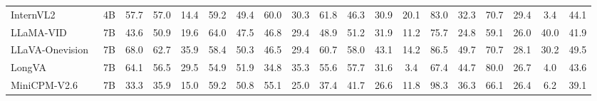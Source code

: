 \begin{table}[ht]
{\begin{tabular}{lc|cccccccccccccccc|c}
        InternVL2~\cite{chen2024internvl2}                   & 4B                                                       & 57.7                  & 57.0                    & 14.4                  & 59.2                  & 49.4                     & {60.0}                   & 30.3                  & 61.8                    & 46.3                  & 30.9                  & 20.1                  & 83.0                   & 32.3                   & 70.7                  & 29.4                    & 3.4                   & 44.1                                      \\
        LLaMA-VID~\cite{li2024llamavid}                   & 7B                                                       & 43.6                  & 50.9                    & 19.6                  & {64.0}                   & 47.5                     & 46.8                   & 29.4                  & 48.9                    & 51.2                  & 31.9                  & 11.2                  & 75.7                   & 24.8                   & 59.1                  & 26.0                    & {40.0}                  & 41.9                                      \\
        LLaVA-Onevision~\cite{li2024llavaov}             & 7B                                                       & 68.0                  & 62.7                    & 35.9                  & 58.4                   & 50.3                     & 46.5                   & 29.4                  & 60.7                    & 58.0                  & 43.1                  & 14.2                  & 86.5                   & {49.7}                   & 70.7                  & 28.1                    & 30.2                  & 49.5                                      \\
        LongVA~\cite{zhang2024longva}                        & 7B                                                       & 64.1                  & 56.5                    & {29.5}                  & 54.9                   & 51.9                     & 34.8                   & 35.3                  & 55.6                    & 57.7                  & 31.6                  & 3.4                   & 67.4                   & 44.7                   & 80.0                  & 26.7                    & 4.0                   & 43.6                                      \\
        MiniCPM-V2.6~\cite{yao2024minicpmv}                & 7B                                                       & 33.3                  & 35.9                    & 15.0                  & 59.2                   & 50.8                     & 55.1                   & 25.0                  & 37.4                    & 41.7                  & 26.6                  & 11.8                  & 98.3                   & 36.3                   & 66.1                  & 26.4                    & 6.2                   & 39.1                                      \\

\end{tabular}}
\end{table}
